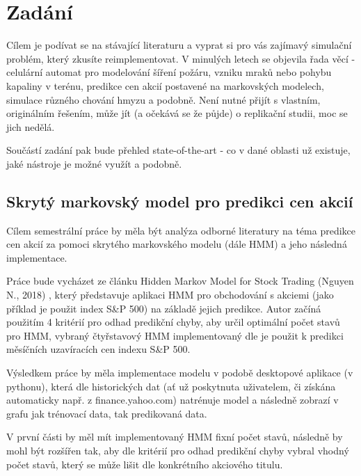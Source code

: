 \section{Zadání}

Cílem je podívat se na stávající literaturu a vyprat si pro vás zajímavý simulační problém, který zkusíte reimplementovat. V minulých letech se objevila řada věcí - celulární automat pro modelování šíření požáru, vzniku mraků nebo pohybu kapaliny v terénu, predikce cen akcií postavené na markovských modelech, simulace různého chování hmyzu a podobně. Není nutné přijít s vlastním, originálním řešením, může jít (a očekává se že půjde) o replikační studii, moc se jich nedělá.

Součástí zadání pak bude přehled state-of-the-art - co v dané oblasti už existuje, jaké nástroje je možné využít a podobně.

\subsection{Skrytý markovský model pro predikci cen akcií}

Cílem semestrální práce by měla být analýza odborné literatury na téma predikce cen akcií za pomoci skrytého markovského modelu (dále HMM) a jeho následná implementace.

Práce bude vycházet ze článku Hidden Markov Model for Stock Trading (Nguyen N., 2018) \cite{Nguyen}, který představuje aplikaci HMM pro obchodování s akciemi (jako příklad je použit index S\&P 500) na základě jejich predikce. Autor začíná použitím 4 kritérií pro odhad predikční chyby, aby určil optimální počet stavů pro HMM, vybraný čtyřstavový HMM implementovaný dle \cite{Hassan} je použit k predikci měsíčních uzavíracích cen indexu S\&P 500.

Výsledkem práce by měla implementace modelu v podobě desktopové aplikace (v pythonu), která dle historických dat (ať už poskytnuta uživatelem, či získána automaticky např. z finance.yahoo.com) natrénuje model a následně zobrazí v grafu jak trénovací data, tak predikovaná data.

V první části by měl mít implementovaný HMM fixní počet stavů, následně by mohl být rozšířen tak, aby dle kritérií pro odhad predikční chyby vybral vhodný počet stavů, který se může lišit dle konkrétního akciového titulu.

\clearpage
